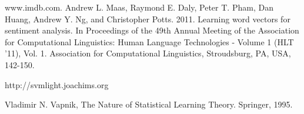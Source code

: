 \documentclass[conference]{IEEEtran}
\begin{document}

%

\begin{thebibliography}{1}

   www.imdb.com.
   Andrew L. Maas, Raymond E. Daly, Peter T. Pham, Dan Huang, Andrew Y. Ng, and Christopher Potts. 2011. Learning word vectors for sentiment analysis. In Proceedings of the 49th Annual Meeting of the Association for Computational Linguistics: Human Language Technologies - Volume 1 (HLT '11), Vol. 1. Association for Computational Linguistics, Stroudsburg, PA, USA, 142-150.

   http://svmlight.joachims.org


   Vladimir N. Vapnik, The Nature of Statistical Learning Theory. Springer, 1995.

\end{thebibliography}
\end{document}
